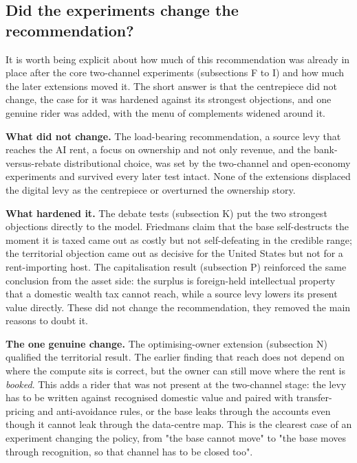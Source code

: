 \documentclass[12pt]{article}
\begin{document}
\hypertarget{did-the-experiments-change-the-recommendation}{%
\subsection{Did the experiments change the
recommendation?}\label{did-the-experiments-change-the-recommendation}}

It is worth being explicit about how much of this recommendation was
already in place after the core two-channel experiments (subsections F
to I) and how much the later extensions moved it. The short answer is
that the centrepiece did not change, the case for it was hardened
against its strongest objections, and one genuine rider was added, with
the menu of complements widened around it.

\textbf{What did not change.} The load-bearing recommendation, a source
levy that reaches the AI rent, a focus on ownership and not only
revenue, and the bank-versus-rebate distributional choice, was set by
the two-channel and open-economy experiments and survived every later
test intact. None of the extensions displaced the digital levy as the
centrepiece or overturned the ownership story.

\textbf{What hardened it.} The debate tests (subsection K) put the two
strongest objections directly to the model. Friedman\textquotesingle s
claim that the base self-destructs the moment it is taxed came out as
costly but not self-defeating in the credible range; the territorial
objection came out as decisive for the United States but not for a
rent-importing host. The capitalisation result (subsection P) reinforced
the same conclusion from the asset side: the surplus is foreign-held
intellectual property that a domestic wealth tax cannot reach, while a
source levy lowers its present value directly. These did not change the
recommendation, they removed the main reasons to doubt it.

\textbf{The one genuine change.} The optimising-owner extension
(subsection N) qualified the territorial result. The earlier finding
that reach does not depend on where the compute sits is correct, but the
owner can still move where the rent is \emph{booked}. This adds a rider
that was not present at the two-channel stage: the levy has to be
written against recognised domestic value and paired with
transfer-pricing and anti-avoidance rules, or the base leaks through the
accounts even though it cannot leak through the data-centre map. This is
the clearest case of an experiment changing the policy, from "the base
cannot move" to "the base moves through recognition, so that channel has
to be closed too".
\end{document}
